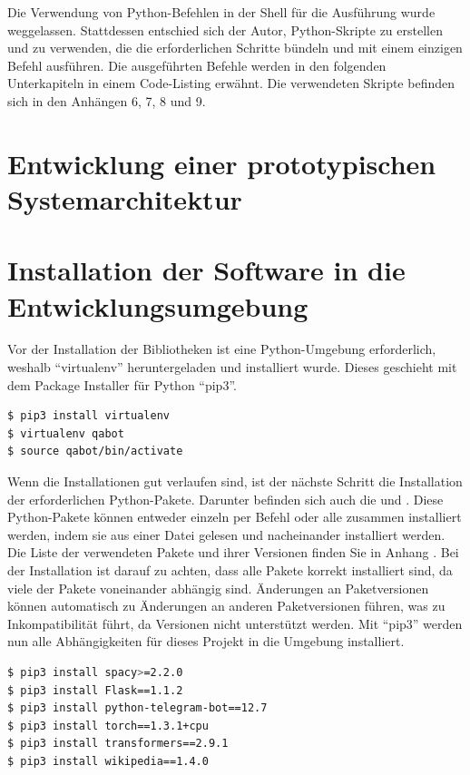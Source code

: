 \documentclass[
        ngerman,
        paper=a4,
        numbers=noendperiod,
]{scrreprt}
\begin{document}
Die Verwendung von Python-Befehlen in der Shell für die Ausführung wurde weggelassen. Stattdessen entschied sich der Autor, Python-Skripte zu erstellen und zu verwenden, die die erforderlichen Schritte bündeln und mit einem einzigen Befehl ausführen. Die ausgeführten Befehle werden in den folgenden Unterkapiteln in einem Code-Listing erwähnt. Die verwendeten Skripte befinden sich in den Anhängen 6, 7, 8 und 9. %


\section{Entwicklung einer prototypischen Systemarchitektur}


\section{Installation der Software in die Entwicklungsumgebung}
Vor der Installation der Bibliotheken ist eine Python-Umgebung erforderlich, weshalb \enquote{virtualenv} heruntergeladen und installiert wurde. Dieses geschieht mit dem Package Installer für Python \enquote{pip3}.

\begin{lstlisting}[language=bash, caption=Einrichten der virtuellen Umgebung]
$ pip3 install virtualenv
$ virtualenv qabot
$ source qabot/bin/activate
\end{lstlisting}

Wenn die Installationen gut verlaufen sind, ist der nächste Schritt die Installation der erforderlichen Python-Pakete.
Darunter befinden sich auch die  und . Diese Python-Pakete können entweder einzeln per Befehl oder alle zusammen installiert werden, indem sie aus einer Datei gelesen und nacheinander installiert werden. Die Liste der verwendeten Pakete und ihrer Versionen finden Sie in Anhang . Bei der Installation ist darauf zu achten, dass alle Pakete korrekt installiert sind, da viele der Pakete voneinander abhängig sind. Änderungen an Paketversionen können automatisch zu Änderungen an anderen Paketversionen führen, was zu Inkompatibilität führt, da Versionen nicht unterstützt werden. 
Mit \enquote{pip3} werden nun alle Abhängigkeiten für dieses Projekt in die Umgebung installiert.


\begin{lstlisting}[language=bash, caption=Installieren der Abhängigkeiten mit pip3]
$ pip3 install spacy>=2.2.0
$ pip3 install Flask==1.1.2
$ pip3 install python-telegram-bot==12.7
$ pip3 install torch==1.3.1+cpu
$ pip3 install transformers==2.9.1
$ pip3 install wikipedia==1.4.0
\end{lstlisting}
\end{document}
